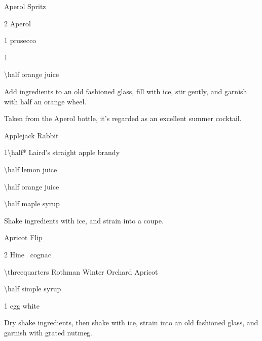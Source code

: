 \begin{Cocktail}[\PDT*]{Aperol Spritz}
  \begin{Ingredients}
    \item \SI{2}{\oz} Aperol
    \item \SI{1}{\oz} prosecco
    \item \SI{1}{\oz} \soda
    \item \SI{\half}{\oz} orange juice
  \end{Ingredients}
  
  \begin{Instructions}
	Add ingredients to an old fashioned glass, fill with ice, stir gently, and
    garnish with half an orange wheel.
	
	Taken from the Aperol bottle, it's regarded as an excellent summer
    cocktail.
  \end{Instructions}
\end{Cocktail}

\begin{Cocktail}[\PDT]{Applejack Rabbit}
  \begin{Ingredients}
    \item \SI{1\half*}{\oz} Laird's straight apple brandy
    \item \SI{\half}{\oz} lemon juice
    \item \SI{\half}{\oz} orange juice
    \item \SI{\half}{\oz} maple syrup
  \end{Ingredients}
  
  \begin{Instructions}
	Shake ingredients with ice, and strain into a coupe.
  \end{Instructions}
\end{Cocktail}

\begin{Cocktail}[\PDT]{Apricot Flip}
  \begin{Ingredients}
    \item \SI{2}{\oz} Hine \vsop\ cognac
    \item \SI{\threequarters}{\oz} Rothman \And Winter Orchard Apricot
    \item \SI{\half}{\oz} simple syrup
    \item 1 egg white
  \end{Ingredients}
  
  \begin{Instructions}
	Dry shake ingredients, then shake with ice, strain into an old fashioned
    glass, and garnish with grated nutmeg.
  \end{Instructions}
\end{Cocktail}


